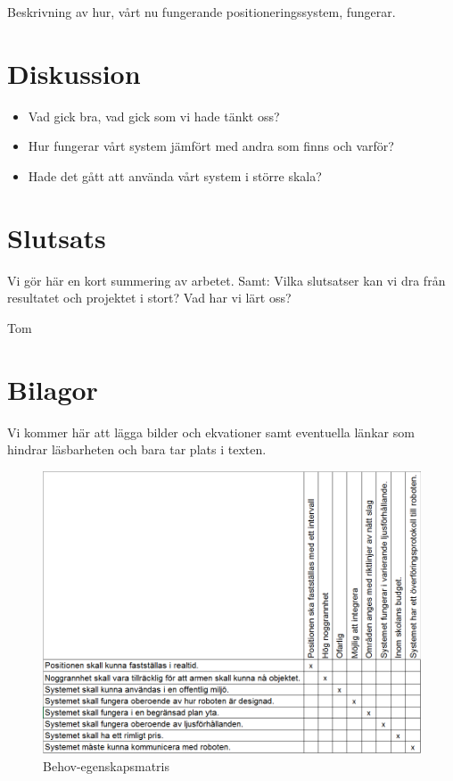 \documentclass[11pt, a4paper]{report}
\begin{document}
Beskrivning av hur, vårt nu fungerande positioneringssystem, fungerar. 

\chapter{Diskussion}
\begin{itemize}
\item Vad gick bra, vad gick som vi hade tänkt oss?
\item Hur fungerar vårt system jämfört med andra som finns och varför?
\item Hade det gått att använda vårt system i större skala?
\end{itemize} 




\chapter{Slutsats}
Vi gör här en kort summering av arbetet.
Samt:
Vilka slutsatser kan vi dra från resultatet och projektet i stort?
Vad har vi lärt oss?






\newpage
\begin{thebibliography}{99}

 Tom

\end{thebibliography}

\chapter{Bilagor}
Vi kommer här att lägga bilder och ekvationer samt eventuella länkar som hindrar läsbarheten och bara tar plats i texten.

\begin{figure}[H]
	\begin{center}
		\includegraphics [width=12cm,angle=0]{behov-egenskap-matris.png}
		\caption{Behov-egenskapsmatris}
		\label{fig:behov-egenskap}
	\end{center}
\end{figure}
\end{document}
